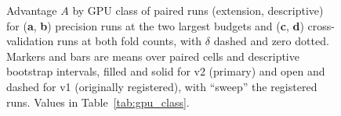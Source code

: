 \begin{figure}[htbp]
\centering
{}
\caption{Advantage $A$ by GPU class of paired runs (extension, descriptive) for (\textbf{a}, \textbf{b}) precision runs at
the two largest budgets and (\textbf{c}, \textbf{d}) cross-validation runs at both fold counts, with $\delta$
dashed and zero dotted. Markers and bars are means over paired cells and descriptive bootstrap intervals, filled
and solid for v2 (primary) and open and dashed for v1 (originally registered), with ``sweep'' the registered runs.
Values in Table~\ref{tab:gpu_class}.}
\label{fig:gpu}
\end{figure}

{\footnotesize\tighttabs
}
\FloatBarrier
